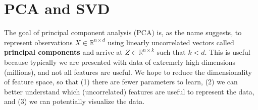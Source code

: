 \documentclass[12pt]{article}
\begin{document}
\section{PCA and SVD}

The goal of principal component analysis (PCA) is, as the name suggests, to represent observations $X\in\mathbb{R}^{n\times d}$ using linearly uncorrelated vectors called \textbf{principal components} and arrive at $Z\in\mathbb{R}^{n\times k}$ such that $k<d$.
This is useful because typically we are presented with data of extremely high dimensions (millions), and not all features are useful. We hope to reduce the dimensionality of feature space, so that (1) there are fewer parameters to learn, (2) we can better understand which (uncorrelated) features are useful to represent the data, and (3) we can potentially visualize the data.







\end{document}

